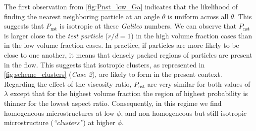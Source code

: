 The first observation from \ref{fig:Pnst_low_Ga} indicates that the likelihood of finding the nearest neighboring particle at an angle $\theta$ is uniform across all $\theta$.
This suggests that $P_\text{nst}$ is isotropic at these \textit{Galileo} numbers. We can observe that $P_\text{nst}$ is larger close to the \textit{test particle} ($r/d = 1$) in the high volume fraction cases than in the low volume fraction cases.
In practice, if particles are more likely to be close to one another, it means that densely packed regions of particles are present in the flow.
This suggests that isotropic clusters, as represented in \ref{fig:scheme_clusters} (\textit{Case 2}), are likely to form in the present context. 
Regarding the effect of the viscosity ratio, $P_\text{nst}$ are very similar for both values of $\lambda$ except that for the highest volume fraction the region of highest probability is thinner for the lowest aspect ratio. 
Consequently, in this regime we find homogeneous microstructures at low $\phi$, and non-homogeneous but still isotropic microstructure (\textit{``clusters''}) at higher $\phi$. 

